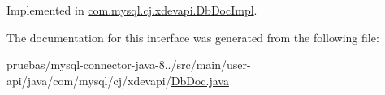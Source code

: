 Implemented in \mbox{\hyperlink{classcom_1_1mysql_1_1cj_1_1xdevapi_1_1_db_doc_impl_afc266a49bb4249ce1a52ce6e69c7daea}{com.\+mysql.\+cj.\+xdevapi.\+Db\+Doc\+Impl}}.



The documentation for this interface was generated from the following file\+:\begin{DoxyCompactItemize}
\item 
pruebas/mysql-\/connector-\/java-\/8../src/main/user-\/api/java/com/mysql/cj/xdevapi/\mbox{\hyperlink{_db_doc_8java}{Db\+Doc.\+java}}\end{DoxyCompactItemize}
